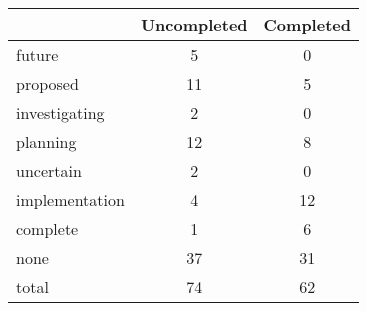 \begin{tabular}{l*{1}{cc}}
 &Uncompleted &Completed  \\
\hline 
future &          5 &          0  \\
proposed &         11 &          5  \\
investigating &          2 &          0  \\
planning &         12 &          8  \\
uncertain &          2 &          0  \\
implementation &          4 &         12  \\
complete &          1 &          6  \\
none &         37 &         31  \\
total &         74 &         62  \\
\hline
\end{tabular}